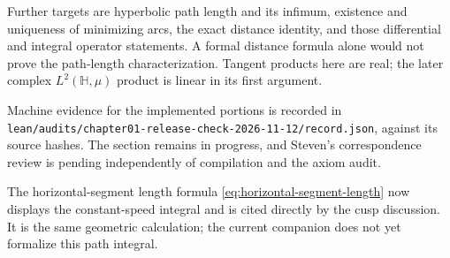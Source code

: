 Further targets are hyperbolic path length and its infimum, existence and uniqueness of minimizing arcs, the exact distance identity, and those differential and integral operator statements. A formal distance formula alone would not prove the path-length characterization. Tangent products here are real; the later complex $L^2(\mathbb H,\mu)$ product is linear in its first argument.

Machine evidence for the implemented portions is recorded in \texttt{lean/audits/chapter01-release-check-2026-11-12/record.json}, against its source hashes. The section remains in progress, and Steven's correspondence review is pending independently of compilation and the axiom audit.

The horizontal-segment length formula \eqref{eq:horizontal-segment-length} now displays the constant-speed integral and is cited directly by the cusp discussion. It is the same geometric calculation; the current companion does not yet formalize this path integral.
